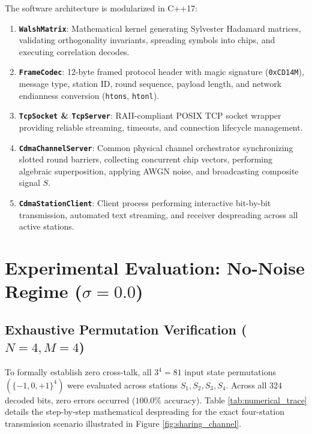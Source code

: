 \documentclass[11pt,a4paper]{article}
\begin{document}
The software architecture is modularized in C++17:
\begin{enumerate}[leftmargin=*]
    \item \textbf{\texttt{WalshMatrix}}: Mathematical kernel generating Sylvester Hadamard matrices, validating orthogonality invariants, spreading symbols into chips, and executing correlation decodes.
    \item \textbf{\texttt{FrameCodec}}: 12-byte framed protocol header with magic signature (\texttt{0xCD14M}), message type, station ID, round sequence, payload length, and network endianness conversion (\texttt{htons}, \texttt{htonl}).
    \item \textbf{\texttt{TcpSocket} \& \texttt{TcpServer}}: RAII-compliant POSIX TCP socket wrapper providing reliable streaming, timeouts, and connection lifecycle management.
    \item \textbf{\texttt{CdmaChannelServer}}: Common physical channel orchestrator synchronizing slotted round barriers, collecting concurrent chip vectors, performing algebraic superposition, applying AWGN noise, and broadcasting composite signal $S$.
    \item \textbf{\texttt{CdmaStationClient}}: Client process performing interactive bit-by-bit transmission, automated text streaming, and receiver despreading across all active stations.
\end{enumerate}

\section{Experimental Evaluation: No-Noise Regime ($\sigma = 0.0$)}

\subsection{Exhaustive Permutation Verification ($N=4, M=4$)}
To formally establish zero cross-talk, all $3^4 = 81$ input state permutations $(\{-1, 0, +1\}^4)$ were evaluated across stations $S_1, S_2, S_3, S_4$. Across all 324 decoded bits, zero errors occurred ($100.0\%$ accuracy). Table \ref{tab:numerical_trace} details the step-by-step mathematical despreading for the exact four-station transmission scenario illustrated in Figure \ref{fig:sharing_channel}.
\end{document}
